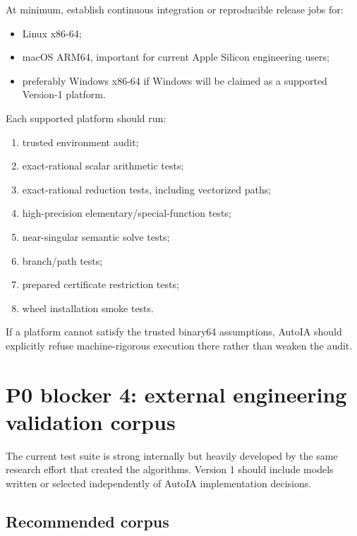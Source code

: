 \documentclass[11pt]{article}
\begin{document}
At minimum, establish continuous integration or reproducible release jobs for:
\begin{itemize}[leftmargin=*]
\item Linux x86-64;
\item macOS ARM64, important for current Apple Silicon engineering users;
\item preferably Windows x86-64 if Windows will be claimed as a supported
Version-1 platform.
\end{itemize}

Each supported platform should run:
\begin{enumerate}[leftmargin=*]
\item trusted environment audit;
\item exact-rational scalar arithmetic tests;
\item exact-rational reduction tests, including vectorized paths;
\item high-precision elementary/special-function tests;
\item near-singular semantic solve tests;
\item branch/path tests;
\item prepared certificate restriction tests;
\item wheel installation smoke tests.
\end{enumerate}

If a platform cannot satisfy the trusted binary64 assumptions, AutoIA should
explicitly refuse machine-rigorous execution there rather than weaken the audit.

\section{P0 blocker 4: external engineering validation corpus}

The current test suite is strong internally but heavily developed by the same
research effort that created the algorithms.  Version 1 should include models
written or selected independently of AutoIA implementation decisions.

\subsection{Recommended corpus}
\end{document}
